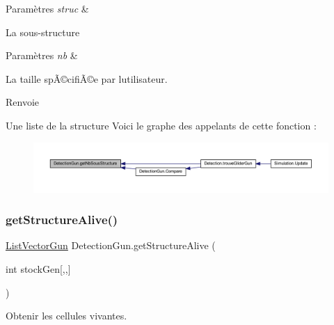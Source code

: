 \begin{DoxyParams}{Paramètres}
{\em struc} & \\
\hline
\end{DoxyParams}
La sous-\/structure 
\begin{DoxyParams}{Paramètres}
{\em nb} & \\
\hline
\end{DoxyParams}
La taille spÃ©cifiÃ©e par l\textquotesingle{}utilisateur. \begin{DoxyReturn}{Renvoie}

\end{DoxyReturn}
Une liste de la structure Voici le graphe des appelants de cette fonction \+:
\nopagebreak
\begin{figure}[H]
\begin{center}
\leavevmode
\includegraphics[width=350pt]{class_detection_gun_a0a14866d2727aea5d457121bd646f3bb_icgraph}
\end{center}
\end{figure}
\mbox{\label{class_detection_gun_a488d963e0b78922904b6bd42182ca7b1}} 
\subsubsection{\texorpdfstring{get\+Structure\+Alive()}{getStructureAlive()}}
{\footnotesize\ttfamily \mbox{\hyperlink{class_list_vector_gun}{List\+Vector\+Gun}} Detection\+Gun.\+get\+Structure\+Alive (\begin{DoxyParamCaption}\item[{int}]{stock\+Gen\mbox{[},,\mbox{]} }\end{DoxyParamCaption})\hspace{0.3cm}{\ttfamily [inline]}}



Obtenir les cellules vivantes. 


